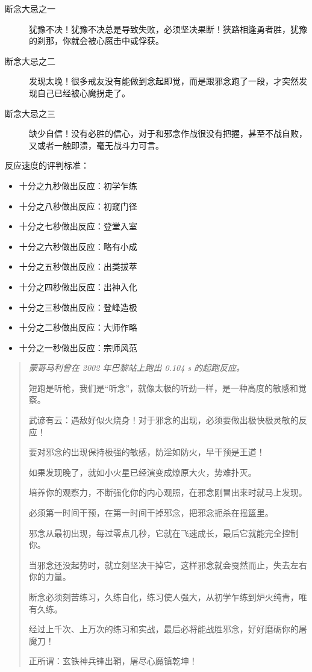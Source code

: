 \begin{description}
    \item[断念大忌之一] 犹豫不决！犹豫不决总是导致失败，必须坚决果断！狭路相逢勇者胜，犹豫的刹那，你就会被心魔击中或俘获。
    \item[断念大忌之二] 发现太晚！很多戒友没有能做到念起即觉，而是跟邪念跑了一段，才突然发现自己已经被心魔拐走了。
    \item[断念大忌之三] 缺少自信！没有必胜的信心，对于和邪念作战很没有把握，甚至不战自败，又或者一触即溃，毫无战斗力可言。
\end{description}

反应速度的评判标准：

\begin{multicols}{2}
    \begin{itemize}
        \item 十分之九秒做出反应：初学乍练
        \item 十分之八秒做出反应：初窥门径
        \item 十分之七秒做出反应：登堂入室
        \item 十分之六秒做出反应：略有小成
        \item 十分之五秒做出反应：出类拔萃
        \item 十分之四秒做出反应：出神入化
        \item 十分之三秒做出反应：登峰造极
        \item 十分之二秒做出反应：大师作略
        \item 十分之一秒做出反应：宗师风范
    \end{itemize}
\end{multicols}

\begin{quotation}\it
    蒙哥马利曾在 2002 年巴黎站上跑出 0.104 \unit{\s} 的起跑反应。

    短跑是听枪，我们是“听念”，就像太极的听劲一样，是一种高度的敏感和觉察。

    武谚有云：遇敌好似火烧身！对于邪念的出现，必须要做出极快极灵敏的反应！

    要对邪念的出现保持极强的敏感，防淫如防火，早干预是王道！

    如果发现晚了，就如小火星已经演变成燎原大火，势难扑灭。

    培养你的观察力，不断强化你的内心观照，在邪念刚冒出来时就马上发现。

    必须第一时间干预，在第一时间干掉邪念，把邪念扼杀在摇篮里。

    邪念从最初出现，每过零点几秒，它就在飞速成长，最后它就能完全控制你。

    当邪念还没起势时，就立刻坚决干掉它，这样邪念就会戛然而止，失去左右你的力量。

    断念必须刻苦练习，久练自化，练习使人强大，从初学乍练到炉火纯青，唯有久练。

    经过上千次、上万次的练习和实战，最后必将能战胜邪念，好好磨砺你的屠魔刀！

    正所谓：玄铁神兵锋出鞘，屠尽心魔镇乾坤！
\end{quotation}

